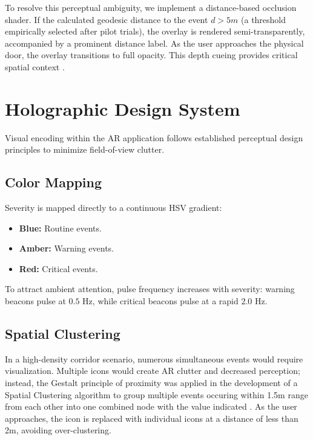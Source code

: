 \documentclass[conference]{IEEEtran}
\begin{document}
To resolve this perceptual ambiguity, we implement a distance-based occlusion shader. If the calculated geodesic distance to the event $d > 5m$ (a threshold empirically selected after pilot trials), the overlay is rendered semi-transparently, accompanied by a prominent distance label. As the user approaches the physical door, the overlay transitions to full opacity. This depth cueing provides critical spatial context \cite{b23}.

\section{Holographic Design System}

Visual encoding within the AR application follows established perceptual design principles to minimize field-of-view clutter.

\subsection{Color Mapping}
Severity is mapped directly to a continuous HSV gradient:
\begin{itemize}
    \item \textbf{Blue:} Routine events.
    \item \textbf{Amber:} Warning events.
    \item \textbf{Red:} Critical events.
\end{itemize}
To attract ambient attention, pulse frequency increases with severity: warning beacons pulse at $0.5$ Hz, while critical beacons pulse at a rapid $2.0$ Hz.

\subsection{Spatial Clustering}
In a high-density corridor scenario, numerous simultaneous events would require visualization. Multiple icons would create AR clutter and decreased perception; instead, the Gestalt principle of proximity was applied in the development of a Spatial Clustering algorithm to group multiple events occuring within 1.5m range from each other into one combined node with the value indicated \cite{b16}. As the user approaches, the icon is replaced with individual icons at a distance of less than 2m, avoiding over-clustering.

\end{document}
